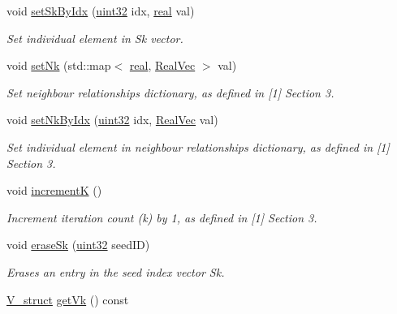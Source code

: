 \begin{DoxyCompactItemize}
void \mbox{\hyperlink{classvd_a578ca6980896563397214c584401c7f5}{set\+Sk\+By\+Idx}} (\mbox{\hyperlink{typedefs_8h_a8ad23e2333787a214e20a58a284a5a60}{uint32}} idx, \mbox{\hyperlink{typedefs_8h_a58a0c7cf2501f4492da833421be92547}{real}} val)
\begin{DoxyCompactList}\small\item\em Set individual element in Sk vector. \end{DoxyCompactList}\item 
void \mbox{\hyperlink{classvd_aa1a3d9448f6ff6f8076b15c9e9a63d7e}{set\+Nk}} (std\+::map$<$ \mbox{\hyperlink{typedefs_8h_a58a0c7cf2501f4492da833421be92547}{real}}, \mbox{\hyperlink{typedefs_8h_a84b6d9a0fbb45e01ad4a3aa5667f2992}{Real\+Vec}} $>$ val)
\begin{DoxyCompactList}\small\item\em Set neighbour relationships dictionary, as defined in \mbox{[}1\mbox{]} Section 3. \end{DoxyCompactList}\item 
void \mbox{\hyperlink{classvd_aa45da38425cbd5b48f61313323ba6204}{set\+Nk\+By\+Idx}} (\mbox{\hyperlink{typedefs_8h_a8ad23e2333787a214e20a58a284a5a60}{uint32}} idx, \mbox{\hyperlink{typedefs_8h_a84b6d9a0fbb45e01ad4a3aa5667f2992}{Real\+Vec}} val)
\begin{DoxyCompactList}\small\item\em Set individual element in neighbour relationships dictionary, as defined in \mbox{[}1\mbox{]} Section 3. \end{DoxyCompactList}\item 
\mbox{\label{classvd_a59c1f5756af7de9cc7a0089221cbd5b7}} 
void \mbox{\hyperlink{classvd_a59c1f5756af7de9cc7a0089221cbd5b7}{incrementK}} ()
\begin{DoxyCompactList}\small\item\em Increment iteration count (k) by 1, as defined in \mbox{[}1\mbox{]} Section 3. \end{DoxyCompactList}\item 
void \mbox{\hyperlink{classvd_a0542124682b77128935d62210a9c86fe}{erase\+Sk}} (\mbox{\hyperlink{typedefs_8h_a8ad23e2333787a214e20a58a284a5a60}{uint32}} seed\+ID)
\begin{DoxyCompactList}\small\item\em Erases an entry in the seed index vector Sk. \end{DoxyCompactList}\item 
\mbox{\hyperlink{structV__struct}{V\+\_\+struct}} \mbox{\hyperlink{classvd_a090bebdbbff36888934c870daf3dcb36}{get\+Vk}} () const

\end{DoxyCompactItemize}
